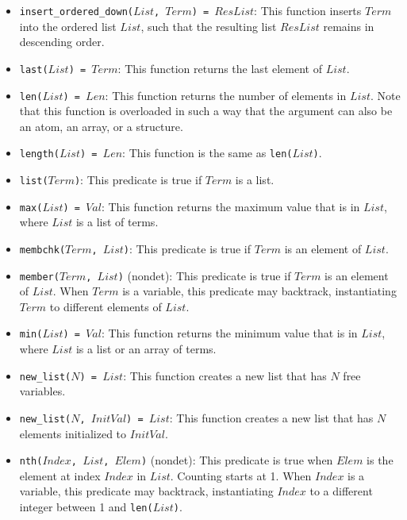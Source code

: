\begin{itemize}
\item \texttt{insert\_ordered\_down($List$, $Term$) = $ResList$}: This function inserts $Term$ into the ordered list $List$, such that the resulting list $ResList$ remains in descending order.
\item \texttt{last($List$) = $Term$}: This function returns the last element of $List$. 
\item \texttt{len($List$) = $Len$}: This function returns the number of elements in $List$. Note that this function is overloaded in such a way that the argument can also be an atom, an array, or a structure.
\item \texttt{length($List$) = $Len$}: This function is the same as \texttt{len($List$)}.
\item \texttt{list($Term$)}: This predicate is true if $Term$ is a list.
\item \texttt{max($List$) = $Val$}: This function returns the maximum value that is in $List$, where $List$ is a list of terms. 
\item \texttt{membchk($Term$, $List$)}: This predicate is true if $Term$ is an element of $List$. 
\item \texttt{member($Term$, $List$)} (nondet): This predicate is true if $Term$ is an element of $List$.  When $Term$ is a variable, this predicate may backtrack, instantiating $Term$ to different elements of $List$.
\item \texttt{min($List$) = $Val$}: This function returns the minimum value that is in $List$, where $List$ is a list or an array of terms. 
\item \texttt{new\_list($N$) = $List$}: This function creates a new list that has $N$ free variables. 
\item \texttt{new\_list($N$, $InitVal$) = $List$}: This function creates a new list that has $N$ elements initialized to $InitVal$. 
\item \texttt{nth($Index$, $List$, $Elem$)} (nondet): This predicate is true when $Elem$ is the element at index $Index$ in $List$.  Counting starts at 1. When $Index$ is a variable, this predicate may backtrack, instantiating $Index$ to a different integer between 1 and \texttt{len($List$)}.


\end{itemize}
